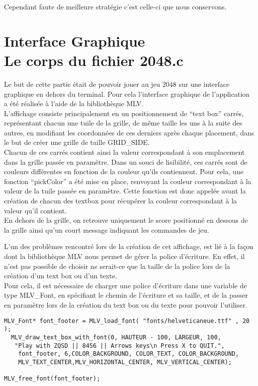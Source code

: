 \documentclass[12pt]{article}
\begin{document}
Cependant faute de meilleure stratégie c'est celle-ci que nous conservons.

\section{Interface Graphique
\\{\small Le corps du fichier 2048.c}}

Le but de cette partie était de pouvoir jouer au jeu 2048 sur une interface graphique en dehors du terminal. Pour cela l'interface graphique de l'application a été réalisée à l'aide de la bibliothèque MLV.\\

L'affichage consiste principalement en un positionnement de ``text box'' carrés, représentant chacun une tuile de la grille, de même taille les uns à la suite des autres, en modifiant les coordonnées de ces derniers après chaque placement, dans le but de créer une grille de taille GRID\_SIDE.\\

Chacun de ces carrés contient ainsi la valeur correspondant à son emplacement dans la grille passée en paramètre. Dans un souci de lisibilité, ces carrés sont de couleurs différentes en fonction de la couleur qu'ils contiennent. Pour cela, une fonction ``pickColor'' a été mise en place, renvoyant la couleur correspondant à la valeur de la tuile passée en paramètre. Cette fonction est donc appelée avant la création de chacun des textbox pour récupérer la couleur correspondant à la valeur qu'il contient.\\

En dehors de la grille, on retrouve uniquement le score positionné en dessous de la grille ainsi qu'un court message indiquant les commandes de jeu.

L'un des problèmes rencontré lors de la création de cet affichage, est lié à la façon dont la bibliothèque MLV nous permet de gérer la police d'écriture. En effet, il n'est pas possible de choisir ne serait-ce que la taille de la police lors de la création d'un text box ou d'un texte.\\
Pour cela, il est nécessaire de charger une police d'écriture dans une variable de type MLV\_Font, en spécifiant le chemin de l'écriture et sa taille, et de la passer en paramètre lors de la création du text box ou du texte pour pouvoir l'utiliser.

\begin{verbatim}
MLV_Font* font_footer = MLV_load_font( "fonts/helveticaneue.ttf" , 20 );
  MLV_draw_text_box_with_font(0, HAUTEUR - 100, LARGEUR, 100,
   "Play with ZQSD || 8456 || Arrows keys\n Press X to QUIT.", 
    font_footer, 6,COLOR_BACKGROUND, COLOR_TEXT, COLOR_BACKGROUND, 
    MLV_TEXT_CENTER,MLV_HORIZONTAL_CENTER, MLV_VERTICAL_CENTER);

MLV_free_font(font_footer);
\end{verbatim}
\end{document}
